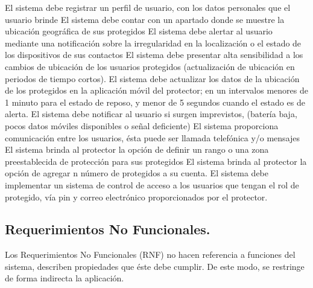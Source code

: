 \begin{NFRequieriments}
	{El sistema debe registrar un perfil de usuario, con los datos personales que el usuario brinde}
	{El sistema debe contar con un apartado donde se muestre la ubicación geográfica de sus protegidos}
	{El sistema debe alertar al usuario mediante una notificación sobre la irregularidad en la localización o el estado de los dispositivos de sus contactos}
	{El sistema debe presentar alta sensibilidad a los cambios de ubicación de los usuarios protegidos (actualización de ubicación en periodos de tiempo cortos).}
	{El sistema debe actualizar los datos de la ubicación de los protegidos en la aplicación móvil del protector; en un intervalos menores de 1 minuto para el estado de reposo, y menor de 5 segundos cuando el estado es de alerta.}
	{El sistema debe notificar al usuario si surgen imprevistos, (batería baja, pocos datos móviles disponibles o señal deficiente)}
	{El sistema proporciona comunicación entre los usuarios, ésta puede ser llamada telefónica y/o mensajes}
	{El sistema brinda al protector la opción de definir un rango o una zona preestablecida de protección para sus protegidos}
	{El sistema brinda al protector  la opción de  agregar n número de protegidos a su cuenta.}
	{El sistema debe implementar un sistema de control de acceso a los usuarios que tengan el rol de protegido, vía pin y correo electrónico  proporcionados por el protector.}
	
	
\end{NFRequieriments}
\newpage 
\subsection{Requerimientos No Funcionales.}
Los Requerimientos No Funcionales (RNF) no hacen referencia a funciones del sistema, describen propiedades que éste debe cumplir. De este modo, se restringe de forma indirecta la aplicación.\\


